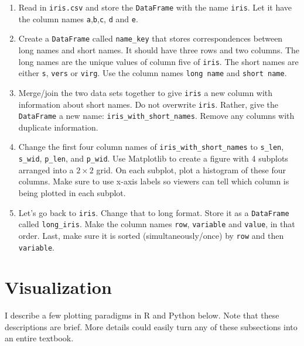 \documentclass[12pt,krantz2]{krantz}
\providecommand{\tightlist}{%
  \setlength{\itemsep}{0pt}\setlength{\parskip}{0pt}}
\begin{document}
\begin{enumerate}
\def\labelenumi{\alph{enumi})}
\tightlist
\item
  Read in \texttt{iris.csv} and store the \texttt{DataFrame} with the name \texttt{iris}. Let it have the column names \texttt{\textquotesingle{}a\textquotesingle{}},\texttt{\textquotesingle{}b\textquotesingle{}},\texttt{\textquotesingle{}c\textquotesingle{}}, \texttt{\textquotesingle{}d\textquotesingle{}} and \texttt{\textquotesingle{}e\textquotesingle{}}.
\item
  Create a \texttt{DataFrame} called \texttt{name\_key} that stores correspondences between long names and short names. It should have three rows and two columns. The long names are the unique values of column five of \texttt{iris}. The short names are either \texttt{\textquotesingle{}s\textquotesingle{}}, \texttt{\textquotesingle{}vers\textquotesingle{}} or \texttt{\textquotesingle{}virg\textquotesingle{}}. Use the column names \texttt{\textquotesingle{}long\ name\textquotesingle{}} and \texttt{\textquotesingle{}short\ name\textquotesingle{}}.
\item
  Merge/join the two data sets together to give \texttt{iris} a new column with information about short names. Do not overwrite \texttt{iris}. Rather, give the \texttt{DataFrame} a new name: \texttt{iris\_with\_short\_names}. Remove any columns with duplicate information.
\item
  Change the first four column names of \texttt{iris\_with\_short\_names} to \texttt{s\_len}, \texttt{s\_wid}, \texttt{p\_len}, and \texttt{p\_wid}. Use Matplotlib to create a figure with 4 subplots arranged into a \(2 \times 2\) grid. On each subplot, plot a histogram of these four columns. Make sure to use x-axis labels so viewers can tell which column is being plotted in each subplot.
\item
  Let's go back to \texttt{iris}. Change that to long format. Store it as a \texttt{DataFrame} called \texttt{long\_iris}. Make the column names \texttt{row}, \texttt{variable} and \texttt{value}, in that order. Last, make sure it is sorted (simultaneously/once) by \texttt{row} and then \texttt{variable}.
\end{enumerate}

\hypertarget{visualization}{%
\chapter{Visualization}\label{visualization}}

I describe a few plotting paradigms in R and Python below. Note that these descriptions are brief. More details could easily turn any of these subsections into an entire textbook.
\end{document}
